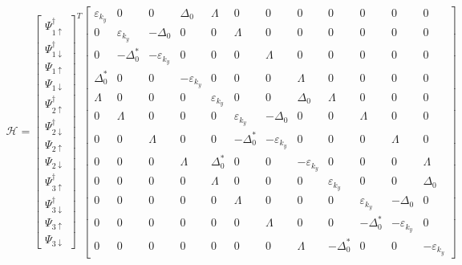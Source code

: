 \documentclass{jsarticle}
\begin{document}
		\begin{align}
			\mathcal{H}=
			\begin{bmatrix}
				\Psi_{1\uparrow}^\dagger \\
				\Psi_{1\downarrow}^\dagger \\
				\Psi_{1\uparrow} \\
				\Psi_{1\downarrow} \\
				\Psi_{2\uparrow}^\dagger \\
				\Psi_{2\downarrow}^\dagger \\
				\Psi_{2\uparrow} \\
				\Psi_{2\downarrow} \\
				\Psi_{3\uparrow}^\dagger \\
				\Psi_{3\downarrow}^\dagger \\
				\Psi_{3\uparrow} \\
				\Psi_{3\downarrow}
			\end{bmatrix}
			^T
			\begin{bmatrix}
				\varepsilon_{k_y} & 0 & 0 & \Delta_0 & \varLambda & 0 & 0 & 0 & 0 & 0 & 0 & 0 \\
				0 & \varepsilon_{k_y} & -\Delta_0 & 0 & 0 & \varLambda & 0 & 0 & 0 & 0 & 0 & 0 \\
				0 & -\Delta_0^\ast & -\varepsilon_{k_y} & 0 & 0 & 0 & \varLambda & 0 & 0 & 0 & 0 & 0 \\
				\Delta_0^\ast & 0 & 0 & -\varepsilon_{k_y} & 0 & 0 & 0 & \varLambda & 0 & 0 & 0 & 0 \\
				\varLambda & 0 & 0 & 0 & \varepsilon_{k_y} & 0 & 0 & \Delta_0 & \varLambda & 0 & 0 & 0 \\
				0 & \varLambda & 0 & 0 & 0 & \varepsilon_{k_y} & -\Delta_0 & 0 & 0 & \varLambda & 0 & 0 \\
				0 & 0 & \varLambda & 0 & 0 & -\Delta_0^\ast & -\varepsilon_{k_y} & 0 & 0 & 0 & \varLambda & 0 \\
				0 & 0 & 0 & \varLambda & \Delta_0^\ast & 0 & 0 & -\varepsilon_{k_y} & 0 & 0 & 0 & \varLambda \\
				0 & 0 & 0 & 0 & \varLambda & 0 & 0 & 0 & \varepsilon_{k_y} & 0 & 0 & \Delta_0 \\
				0 & 0 & 0 & 0 & 0 & \varLambda & 0 & 0 & 0 & \varepsilon_{k_y} & -\Delta_0 & 0 \\
				0 & 0 & 0 & 0 & 0 & 0 & \varLambda & 0 & 0 & -\Delta_0^\ast & -\varepsilon_{k_y} & 0 \\
				0 & 0 & 0 & 0 & 0 & 0 & 0 & \varLambda & -\Delta_0^\ast & 0 & 0 & -\varepsilon_{k_y}
			\end{bmatrix}

\end{align}
\end{document}
